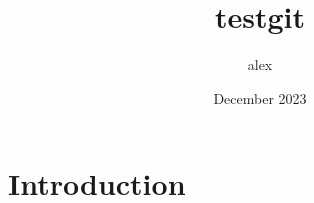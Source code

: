 \documentclass{article}
\title{testgit}
\author{alex }
\date{December 2023}
\begin{document}
\maketitle

\section{Introduction}
\end{document}
